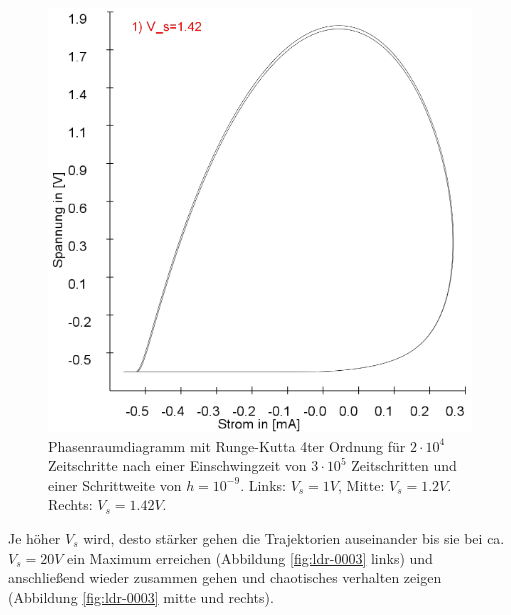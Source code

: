 \documentclass{scrartcl}
\begin{document}
\begin{figure}[!htbp]
\includegraphics[scale=0.28]{schwing-runge-nach300k-weitere20k-10-9-1,42V}
\caption{Phasenraumdiagramm mit Runge-Kutta 4ter Ordnung für $2\cdot10^4$ Zeitschritte nach einer Einschwingzeit von  $3\cdot10^5$ Zeitschritten und einer Schrittweite von $h=10^{-9}$. Links: $V_s=1V$, Mitte: $V_s=1.2V$. Rechts: $V_s=1.42V$.}
\label{fig:ldr-0002}
\end{figure}
Je höher $V_s$ wird, desto stärker gehen die Trajektorien auseinander bis sie bei ca. $V_s=20V$ ein Maximum erreichen (Abbildung \ref{fig:ldr-0003} links) und anschließend wieder zusammen gehen und chaotisches verhalten zeigen (Abbildung \ref{fig:ldr-0003} mitte und rechts).
\end{document}
